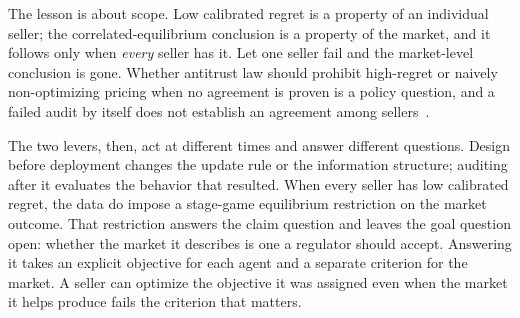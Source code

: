 The lesson is about scope. Low calibrated regret is a property of an individual
seller; the correlated-equilibrium conclusion is a property of the market, and it
follows only when \emph{every} seller has it. Let one seller fail and the market-level
conclusion is gone. Whether antitrust law should prohibit high-regret or naively
non-optimizing pricing when no agreement is proven is a policy question, and a failed
audit by itself does not establish an agreement among
sellers~\citep{Harrington2018}.

The two levers, then, act at different times and answer different questions. Design
before deployment changes the update rule or the information structure; auditing after
it evaluates the behavior that resulted. When every seller has low calibrated regret,
the data do impose a stage-game equilibrium restriction on the market outcome. That
restriction answers the claim question and leaves the goal question open: whether the
market it describes is one a regulator should accept. Answering it takes an explicit objective for each
agent and a separate criterion for the market. A seller can optimize the objective it
was assigned even when the market it helps produce fails the criterion that matters.
